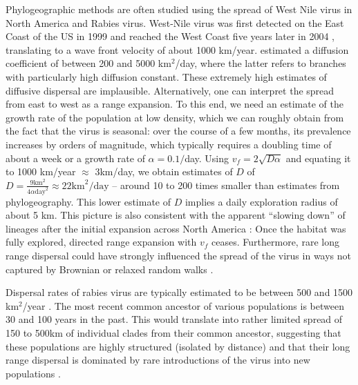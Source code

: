 \documentclass[aps,rmp, twocolumn]{revtex4}
\newcommand{\vfkpp}{v_f}
\begin{document}
Phylogeographic methods are often studied using the spread of West Nile virus in North America and Rabies virus.
West-Nile virus was first detected on the East Coast of the US in 1999 and reached the West Coast five years later in 2004 \citep{pybus_unifying_2012}, translating to a wave front velocity of about 1000 km/year.
\citet{pybus_unifying_2012} estimated a diffusion coefficient of between 200 and 5000 km$^2$/day, where the latter refers to branches with particularly high diffusion constant.
These extremely high estimates of diffusive dispersal are implausible.
Alternatively, one can interpret the spread from east to west as a range expansion.
To this end, we need an estimate of the growth rate of the population at low density, which we can roughly obtain from the fact that the virus is seasonal: over the course of a few months, its prevalence increases by orders of magnitude, which typically requires a doubling time of about a week or a growth rate of $\alpha=0.1/$day.
Using $\vfkpp = 2\sqrt{D\alpha}$ and equating it to 1000 km/year $\approx$ 3km/day, we obtain estimates of $D$ of $D=\frac{9 \mathrm{km}^2}{4 \alpha \mathrm{day}^2} \approx 22\mathrm{km}^2/\mathrm{day}$ -- around 10 to 200 times smaller than estimates from phylogeography.
This lower estimate of $D$ implies a daily exploration radius of about 5 km.
This picture is also consistent with the apparent ``slowing down'' of lineages after the initial expansion across North America \citep{dellicour_epidemiological_2020}: Once the habitat was fully explored, directed range expansion with $\vfkpp$ ceases.
Furthermore, rare long range dispersal could have strongly influenced the spread of the virus in ways not captured by Brownian or relaxed random walks \citep{hallatschek_acceleration_2014}.

Dispersal rates of rabies virus are typically estimated to be between 500 and 1500 km$^2$/year \citep{dellicour_using_2017}.
The most recent common ancestor of various populations is between 30 and 100 years in the past.
This would translate into rather limited spread of 150 to 500km of individual clades from their common ancestor, suggesting that these populations are highly structured (isolated by distance) and that their long range dispersal is dominated by rare introductions of the virus into new populations \citep{brunker_elucidating_2015}.
\end{document}
